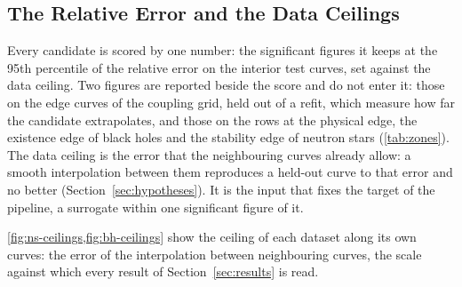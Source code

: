 \subsection{The Relative Error and the Data Ceilings}
\label{sec:error-metric}

Every candidate is scored by one number: the significant figures it keeps at the 95th percentile of the relative error on the interior test curves, set against the data ceiling. Two figures are reported beside the score and do not enter it: those on the edge curves of the coupling grid, held out of a refit, which measure how far the candidate extrapolates, and those on the rows at the physical edge, the existence edge of black holes and the stability edge of neutron stars (\cref{tab:zones}). The data ceiling is the error that the neighbouring curves already allow: a smooth interpolation between them reproduces a held-out curve to that error and no better (Section~\ref{sec:hypotheses}). It is the input that fixes the target of the pipeline, a surrogate within one significant figure of it.

\cref{fig:ns-ceilings,fig:bh-ceilings} show the ceiling of each dataset along its own curves: the error of the interpolation between neighbouring curves, the scale against which every result of Section~\ref{sec:results} is read.


